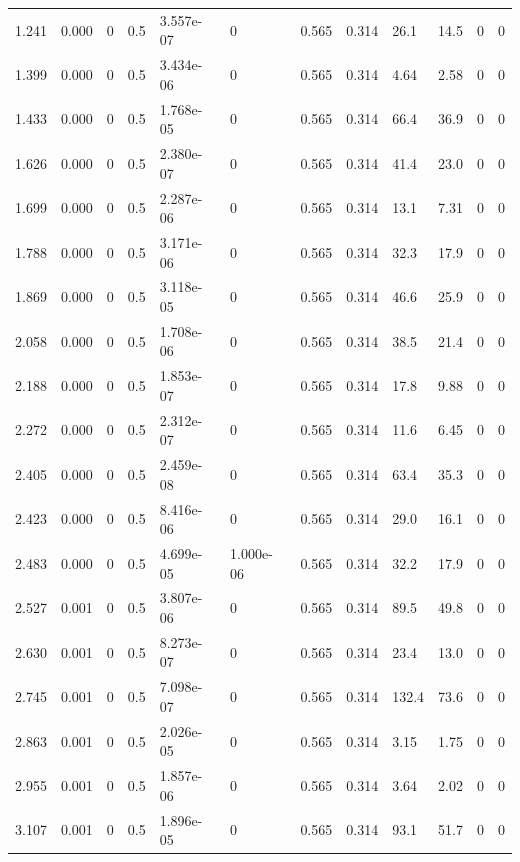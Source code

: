 \documentclass[preview]{standalone}
\begin{document}
{{\begin{tabular}{L{1.2cm}C{1.2cm} C{0.3cm}C{0.5cm} C{1.4cm}C{1.4cm} C{1.4cm}C{1.4cm} C{1.6cm}C{1.6cm} C{1.6cm}C{1.6cm}}
  1.241  &  0.000  & 0     & 0.5 &  3.557e-07  & 0  &  0.565&   0.314& 26.1 & 14.5   &  0 & 0  \\ 
  1.399  &  0.000  & 0     & 0.5 &  3.434e-06  & 0  &  0.565&   0.314& 4.64 & 2.58   &  0 & 0  \\ 
  1.433  &  0.000  & 0     & 0.5 &  1.768e-05  & 0  &  0.565&   0.314& 66.4 & 36.9   &  0 & 0  \\ 
  1.626  &  0.000  & 0     & 0.5 &  2.380e-07  & 0  &  0.565&   0.314& 41.4 & 23.0   &  0 & 0  \\ 
  1.699  &  0.000  & 0     & 0.5 &  2.287e-06  & 0  &  0.565&   0.314& 13.1 & 7.31   &  0 & 0  \\ 
  1.788  &  0.000  & 0     & 0.5 &  3.171e-06  & 0  &  0.565&   0.314& 32.3 & 17.9   &  0 & 0  \\ 
  1.869  &  0.000  & 0     & 0.5 &  3.118e-05  & 0  &  0.565&   0.314& 46.6 & 25.9   &  0 & 0  \\ 
  2.058  &  0.000  & 0     & 0.5 &  1.708e-06  & 0  &  0.565&   0.314& 38.5 & 21.4   &  0 & 0  \\ 
  2.188  &  0.000  & 0     & 0.5 &  1.853e-07  & 0  &  0.565&   0.314& 17.8 & 9.88   &  0 & 0  \\ 
  2.272  &  0.000  & 0     & 0.5 &  2.312e-07  & 0  &  0.565&   0.314& 11.6 & 6.45   &  0 & 0  \\ 
  2.405  &  0.000  & 0     & 0.5 &  2.459e-08  & 0  &  0.565&   0.314& 63.4 & 35.3   &  0 & 0  \\ 
  2.423  &  0.000  & 0     & 0.5 &  8.416e-06  & 0  &  0.565&   0.314& 29.0 & 16.1   &  0 & 0  \\ 
  2.483  &  0.000  & 0     & 0.5 &  4.699e-05  & 1.000e-06  &  0.565&   0.314& 32.2 & 17.9   &  0 & 0  \\ 
  2.527  &  0.001  & 0     & 0.5 &  3.807e-06  & 0  &  0.565&   0.314& 89.5 & 49.8   &  0 & 0  \\ 
  2.630  &  0.001  & 0     & 0.5 &  8.273e-07  & 0  &  0.565&   0.314& 23.4 & 13.0   &  0 & 0  \\ 
  2.745  &  0.001  & 0     & 0.5 &  7.098e-07  & 0  &  0.565&   0.314& 132.4 & 73.6   &  0 & 0  \\ 
  2.863  &  0.001  & 0     & 0.5 &  2.026e-05  & 0  &  0.565&   0.314& 3.15 & 1.75   &  0 & 0  \\ 
  2.955  &  0.001  & 0     & 0.5 &  1.857e-06  & 0  &  0.565&   0.314& 3.64 & 2.02   &  0 & 0  \\ 
  3.107  &  0.001  & 0     & 0.5 &  1.896e-05  & 0  &  0.565&   0.314& 93.1 & 51.7   &  0 & 0  \\ 

\end{tabular}}}
\end{document}
